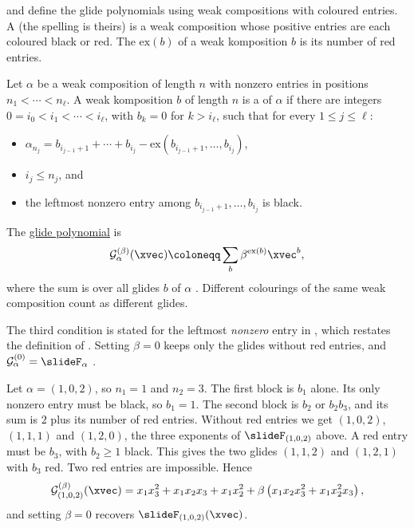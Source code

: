  and  define the glide
polynomials using weak compositions with coloured entries.
A \label{weakKomposition} (the spelling is theirs) is
a weak composition whose positive entries are each coloured black or red.
The  $\mathrm{ex}(b)$ of a weak komposition $b$ is its number
of red entries.

\begin{definition}
Let $\alpha$ be a weak composition of length $n$ with nonzero entries in
positions $n_1<\dotsb<n_\ell$.  A weak komposition $b$ of length $n$ is a
\label{glideOfWeakComposition} of $\alpha$ if there are integers
$0=i_0<i_1<\dotsb<i_\ell$, with $b_k=0$ for $k>i_\ell$, such that for every
$1\leq j\leq \ell$:
\begin{itemize}
\item $\alpha_{n_j}=b_{i_{j-1}+1}+\dotsb+b_{i_j}
  -\mathrm{ex}(b_{i_{j-1}+1},\dotsc,b_{i_j})$,
\item $i_j\leq n_j$, and
\item the leftmost nonzero entry among $b_{i_{j-1}+1},\dotsc,b_{i_j}$ is black.
\end{itemize}
The \hyperref[glidePolynomial]{glide polynomial} is
\[
\mathcal{G}^{(\beta)}_\alpha(\xvec)
\coloneqq
\sum_{b} \beta^{\mathrm{ex}(b)}\xvec^{b},
\]
where the sum is over all glides $b$ of $\alpha$
\cite[Def.~2.2 and Def.~2.5]{PechenikSearles2017}.
Different colourings of the same weak composition count as different glides.
\end{definition}

The third condition is stated for the leftmost \emph{nonzero} entry in
\cite[Def.~2.1]{MonicalPechenikSearles2021}, which restates the definition
of \cite{PechenikSearles2017}.
Setting $\beta=0$ keeps only the glides without red entries, and
$\mathcal{G}^{(0)}_\alpha=\slideF_\alpha$
\cite[Prop.~2.16]{PechenikSearles2017}.

\begin{example}
Let $\alpha=(1,0,2)$, so $n_1=1$ and $n_2=3$.
The first block is $b_1$ alone.  Its only nonzero entry must be black, so
$b_1=1$.
The second block is $b_2$ or $b_2b_3$, and its sum is $2$ plus its number of
red entries.
Without red entries we get $(1,0,2)$, $(1,1,1)$ and $(1,2,0)$, the three
exponents of $\slideF_{(1,0,2)}$ above.
A red entry must be $b_3$, with $b_2\geq 1$ black.  This gives the two glides
$(1,1,2)$ and $(1,2,1)$ with $b_3$ red.  Two red entries are impossible.
Hence
\[
\mathcal{G}^{(\beta)}_{(1,0,2)}(\xvec)
=
x_1x_3^2+x_1x_2x_3+x_1x_2^2
+\beta\left(x_1x_2x_3^2+x_1x_2^2x_3\right),
\]
and setting $\beta=0$ recovers $\slideF_{(1,0,2)}(\xvec)$.
\end{example}

